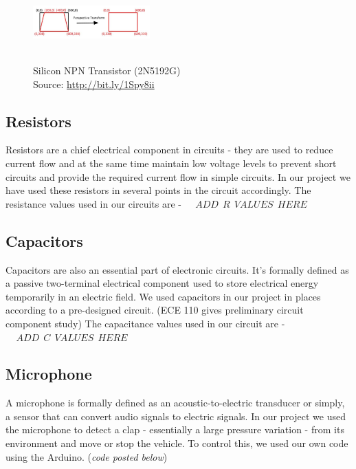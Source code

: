 \documentclass[12pt,a4paper]{article}
\begin{document}
\begin{large}
\begin{figure}[hbp]
\centering
\includegraphics[width=0.4\textwidth, height = 3cm]{images/perspective_transform.jpg}
\caption{\label{fig:4}Silicon NPN Transistor (2N5192G)\\Source: \protect\url{http://bit.ly/1Spy8ii}}
\end{figure}

\subsection{Resistors}

Resistors are a chief electrical component in circuits - they are used to reduce current flow and at the same time maintain low voltage levels  to prevent short circuits and provide the required current flow in simple circuits. In our project we have used these resistors in several points in the circuit accordingly. The resistance values used in our circuits are - $~~~~~ADD ~~R~~ VALUES ~~HERE~~~~$\\


\subsection{Capacitors}

Capacitors are also an essential part of electronic circuits. It's formally defined as a passive two-terminal electrical component used to store electrical energy temporarily in an electric field. We used capacitors in our project in places according to a pre-designed circuit. (ECE 110 gives preliminary circuit component study) The capacitance values used in our circuit are - $~~~~~ADD ~~C~~ VALUES ~~HERE~~~~$

\subsection{Microphone}

A microphone is formally defined as an acoustic-to-electric transducer or simply, a sensor that can convert audio signals to electric signals. In our project we used the microphone to detect a clap - essentially a large pressure variation - from its environment and move or stop the vehicle. To control this, we used our own code using the Arduino. (\textit{code posted below})

\end{large}
\end{document}
